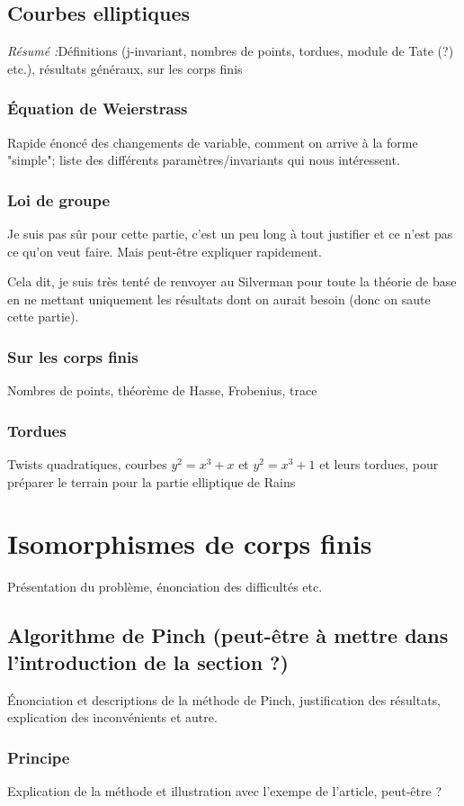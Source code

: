 \documentclass[a4paper]{article} %
\numberwithin{equation}{section}
\begin{document}
\subsection{Courbes elliptiques}
\textit{Résumé :}Définitions (j-invariant, nombres de points, tordues, module de
Tate (?) etc.), résultats généraux, sur les corps finis
\subsubsection{Équation de Weierstrass}
Rapide énoncé des changements de variable, comment on arrive à la forme
"simple"; liste des différents paramètres/invariants qui nous intéressent.
\subsubsection{Loi de groupe}
Je suis pas sûr pour cette partie, c'est un peu long à tout justifier et ce
n'est pas ce qu'on veut faire. Mais peut-être expliquer rapidement.\par
Cela dit, je suis très tenté de renvoyer au Silverman pour toute la théorie de
base en ne mettant uniquement les résultats dont on aurait besoin (donc on saute
cette partie).
\subsubsection{Sur les corps finis}
Nombres de points, théorème de Hasse, Frobenius, trace
\subsubsection{Tordues}
Twists quadratiques, courbes $y^2 = x^3 + x$ et $y^2 = x^3 + 1$ et leurs
tordues, pour préparer le terrain pour la partie elliptique de Rains


\section{Isomorphismes de corps finis}
Présentation du problème, énonciation des difficultés etc.

\subsection{Algorithme de Pinch (peut-être à mettre dans l'introduction de 
la section ?)}
Énonciation et descriptions de la méthode de Pinch, justification des 
résultats, explication des inconvénients et autre.
\subsubsection{Principe}
Explication de la méthode et illustration avec l'exempe de l'article, peut-être
?
\end{document}
